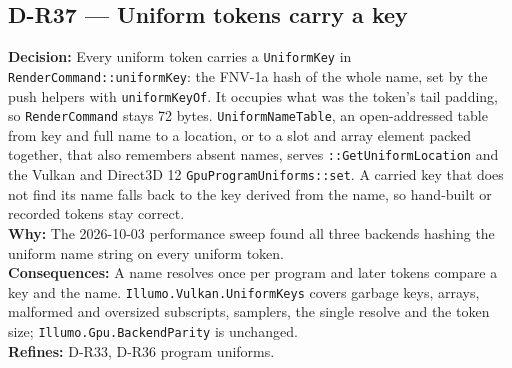 \subsection*{D-R37 --- Uniform tokens carry a key}
\begin{decisionbox}[title={D-R37 \quad 2026-10-03}]
\textbf{Decision:} Every uniform token carries a \texttt{UniformKey} in
\texttt{RenderCommand::uniformKey}: the FNV-1a hash of the whole name, set by
the  push helpers with \texttt{uniformKeyOf}. It occupies
what was the token's tail padding, so \texttt{RenderCommand} stays 72 bytes.
\texttt{UniformNameTable}, an open-addressed table from key and full name to
a location, or to a slot and array element packed together, that also
remembers absent names, serves
\texttt{::GetUniformLocation} and the Vulkan and
Direct3D 12 \texttt{GpuProgramUniforms::set}. A carried key that does not
find its name falls back to the key derived from the name, so hand-built or
recorded tokens stay correct.\\
\textbf{Why:} The 2026-10-03 performance sweep found all three backends
hashing the uniform name string on every uniform token.\\
\textbf{Consequences:} A name resolves once per program and later tokens
compare a key and the name. \texttt{Illumo.Vulkan.UniformKeys} covers garbage
keys, arrays, malformed and oversized subscripts, samplers, the single resolve
and the token size;
\texttt{Illumo.Gpu.BackendParity} is unchanged.\\
\textbf{Refines:} D-R33, D-R36 program uniforms.
\end{decisionbox}


